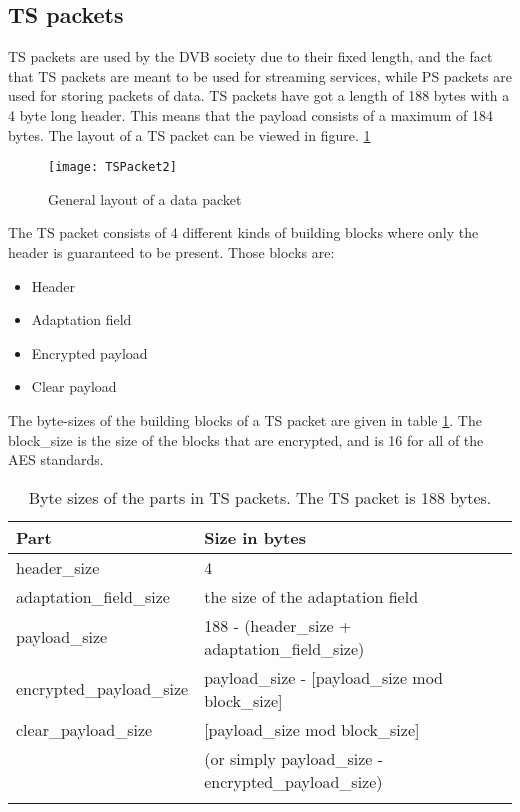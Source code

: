 \subsection{TS packets}
TS packets are used by the DVB society due to their fixed length, and 
the fact that TS packets are meant to be used for streaming services, 
while PS packets are used for storing packets of data. TS packets have 
got a length of 188 bytes with a 4 byte long header. This means that 
the payload consists of a maximum of 184 bytes. The layout of a TS 
packet can be viewed in figure. \ref{img:Package}\citep{DVB:2013}

\begin{figure}[h!]
  \texttt{[image: TSPacket2]}
  \caption{General layout of a data packet}
  \label{img:Package}
\end{figure}

The TS packet consists of 4 different kinds of building blocks where 
only the header is guaranteed to be present. Those blocks are:

\begin{itemize}
\item Header
\item Adaptation field
\item Encrypted payload
\item Clear payload
\end{itemize}

The byte-sizes of the building blocks of a TS packet are given in 
table \ref{table:sizes}. The block\_size is the size of the blocks 
that are encrypted, and is 16 for all of the AES standards.

\begin{longtable}{| l | l |}
  \hline
  Part & Size in bytes \\ \hline
  header\_size & 4 \\ \hline
  adaptation\_field\_size & the size of the adaptation field \\ \hline
  payload\_size & 188 - (header\_size + adaptation\_field\_size) \\ 
  \hline
  encrypted\_payload\_size & payload\_size - [payload\_size mod 
    block\_size] \\ \hline
  clear\_payload\_size & [payload\_size mod block\_size] \\
   & (or simply payload\_size - encrypted\_payload\_size) \\ \hline 
  \caption{Byte sizes of the parts in TS packets. The TS packet is 
    188 bytes.}
  \label{table:sizes}
\end{longtable}

